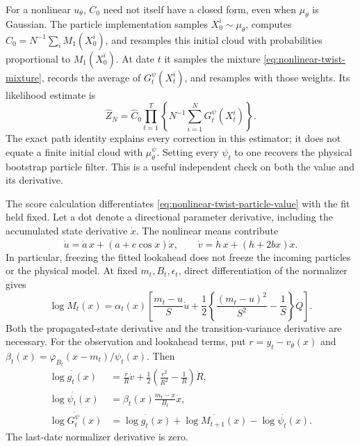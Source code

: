 \documentclass[11pt]{article}
\begin{document}
For a nonlinear $u_\theta$, $C_0$ need not itself have a closed form, even
when $\mu_\theta$ is Gaussian. The particle implementation samples
$X_0^i\sim\mu_\theta$, computes
$\widehat C_0=N^{-1}\sum_i M_1(X_0^i)$, and resamples this initial cloud with
probabilities proportional to $M_1(X_0^i)$. At date $t$ it samples the mixture
\eqref{eq:nonlinear-twist-mixture}, records the average of
$G_t^\psi(X_t^i)$, and resamples with those weights. Its likelihood estimate is
\begin{equation}
 \widehat Z_N=\widehat C_0\prod_{t=1}^T
       \left\{N^{-1}\sum_{i=1}^N G_t^\psi(X_t^i)\right\}.
 \label{eq:nonlinear-twist-particle-value}
\end{equation}
The exact path identity explains every correction in this estimator; it does
not equate a finite initial cloud with $\mu_\theta^\psi$. Setting every
$\psi_t$ to one recovers the physical bootstrap particle filter. This is a
useful independent check on both the value and its derivative.

The score calculation differentiates
\eqref{eq:nonlinear-twist-particle-value} with the fit held fixed. Let a dot
denote a directional parameter derivative, including the accumulated state
derivative $\dot x$. The nonlinear means contribute
\begin{equation}
 \dot u=\dot a\,x+(a+c\cos x)\dot x,\qquad
 \dot v=\dot h\,x+(h+2bx)\dot x.
 \label{eq:nonlinear-twist-mean-tangents}
\end{equation}
In particular, freezing the fitted lookahead does not freeze the incoming
particles or the physical model. At fixed $m_t,B_t,\epsilon_t$, direct
differentiation of the normalizer gives
\begin{equation}
 \dot{\log M_t(x)}=\alpha_t(x)\left[
   \frac{m_t-u}{S}\dot u+
   \frac12\left\{\frac{(m_t-u)^2}{S^2}-\frac1S\right\}\dot Q
   \right].
 \label{eq:nonlinear-twist-normalizer-tangent}
\end{equation}
Both the propagated-state derivative and the transition-variance derivative
are necessary. For the observation and lookahead terms, put
$r=y_t-v_\theta(x)$ and
$\beta_t(x)=\varphi_{B_t}(x-m_t)/\psi_t(x)$. Then
\begin{align}
 \dot{\log g_t(x)}
  &=\frac{r}{R}\dot v+
    \frac12\left(\frac{r^2}{R^2}-\frac1R\right)\dot R,\\
 \dot{\log\psi_t(x)}&=\beta_t(x)\frac{m_t-x}{B_t}\dot x,\\
 \dot{\log G_t^\psi(x)}
  &=\dot{\log g_t(x)}+\dot{\log M_{t+1}(x)}
                       -\dot{\log\psi_t(x)}.
 \label{eq:nonlinear-twist-weight-tangents}
\end{align}
The last-date normalizer derivative is zero.
\end{document}
